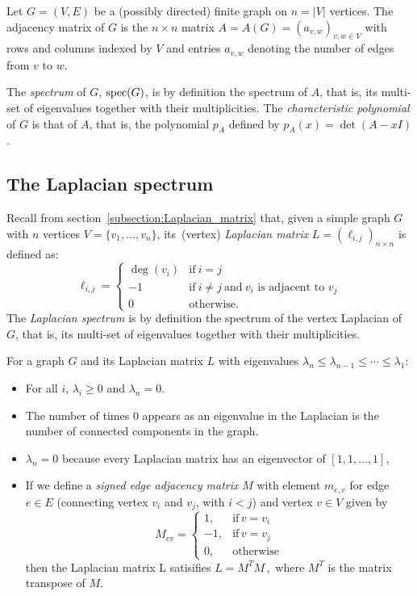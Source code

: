 Let $G = (V,E)$ be a (possibly directed) finite graph on
$n = \vert V \vert$ vertices. The adjacency matrix of $G$ is the
$n \times n$ matrix $A = A( G ) = (a_{v,w} )_{ v,w \in V }$ with rows
and columns indexed by $V$ and entries $a_{v,w}$ denoting the number
of edges from $v$ to $w$.

The {\it spectrum} of $G$, ${\rm spec}(G)$, is by definition the spectrum of $A$,
that is, its multi-set of eigenvalues together with their multiplicities.
The {\it characteristic polynomial} of $G$ is that of $A$, that is,
the polynomial $p_A$ defined by $p_A ( x ) = \det (A- x I )$.



\subsection{The Laplacian spectrum}

Recall from section~\ref{subsection:Laplacian_matrix} that, given a
simple graph $G$ with $n$ vertices $V = \{v_1, \dots, v_n\}$,
its~(vertex) \emph{Laplacian matrix}
$L = (\ell_{i,j})_{n \times n}$ is defined as:
\[
\ell_{i,j}
=
\begin{cases}
\deg(v_i) & \mbox{if}\ i = j \\
-1 & \mbox{if}\ i \neq j\ \mbox{and}\ v_i \mbox{ is adjacent to } v_j \\
0 & \mbox{otherwise}.
\end{cases}
\]
The {\it Laplacian spectrum} is by definition the spectrum of the
vertex Laplacian of $G$,
that is, its multi-set of eigenvalues together with their multiplicities.

For a graph $G$ and its Laplacian matrix $L$ with eigenvalues
$\lambda_n \le \lambda_{n-1} \le \cdots \le \lambda_{1}$:

\begin{itemize}
\item
For all $i$, $\lambda_i \ge 0$ and $\lambda_n = 0$.
\item
   The number of times $0$ appears as an eigenvalue in the
Laplacian is the number of connected components in the graph.
\item
$\lambda_n=0$ because every Laplacian matrix has an eigenvector of
$[1,1,\dots,1]$,
\item
If we define a {\it signed edge adjacency matrix} $M$ with element
$m_{e,v}$ for edge $e\in E$ (connecting vertex $v_i$ and $v_j$, with
$i < j$) and vertex $v\in V$ given by
\[
    M_{ev} = \left\{
\begin{array}{rl}
1, & \text{if}\,v=v_i\\
-1, & \text{if}\,v=v_j\\
0, & \text{otherwise}
\end{array}
\right.
\]
then the Laplacian matrix L satisifies
$    L = M^{T} M\,,$
where $M^T$ is the matrix transpose of $M$.
\end{itemize}

